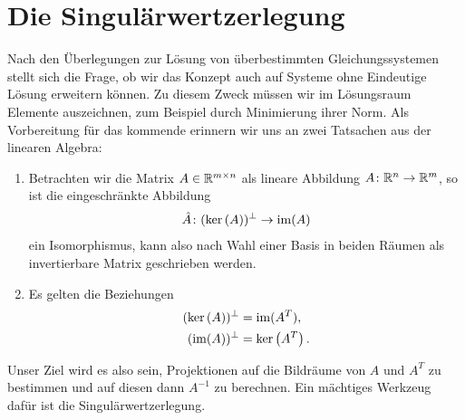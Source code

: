 \section{Die Singulärwertzerlegung}

\begin{intro}
  Nach den Überlegungen zur Lösung von überbestimmten
  Gleichungssystemen stellt sich die Frage, ob wir das Konzept auch
  auf Systeme ohne Eindeutige Lösung erweitern können. Zu diesem Zweck
  müssen wir im Lösungsraum Elemente auszeichnen, zum Beispiel durch
  Minimierung ihrer Norm.
  Als Vorbereitung für das kommende erinnern wir uns an zwei Tatsachen
  aus der linearen Algebra:

  \begin{enumerate}
  \item Betrachten wir die Matrix $A\in \mathbb R^{m\times n}$ als lineare
    Abbildung $A\colon \mathbb R^n\to \mathbb R^m$, so ist die eingeschränkte
    Abbildung
    \begin{gather}
      \hat A\colon (\operatorname{ker}\left(A\right))^\perp \to \operatorname{im}(A)
    \end{gather}
    ein Isomorphismus, kann also nach Wahl einer Basis in beiden
    Räumen als invertierbare Matrix geschrieben werden.
  \item Es gelten die Beziehungen
    \begin{gather}
      \begin{aligned}
        (\operatorname{ker}\left(A\right))^\perp &= \operatorname{im}(A^T),\\
        (\operatorname{im}(A))^\perp &= \operatorname{ker}\left(A^T\right).
      \end{aligned}
    \end{gather}
  \end{enumerate}
  
  Unser Ziel wird es also sein, Projektionen auf die Bildräume von $A$
  und $A^T$ zu bestimmen und auf diesen dann $A^{-1}$ zu
  berechnen. Ein mächtiges Werkzeug dafür ist die
  Singulärwertzerlegung.
\end{intro}






\printindex

